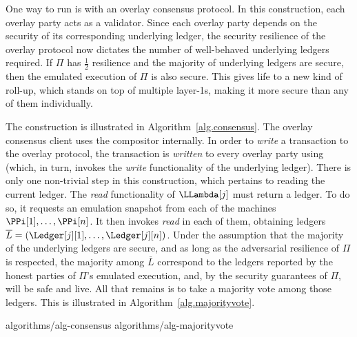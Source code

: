 \label{sec:consensus}

One way to run \rollerblade is with an overlay consensus protocol.
In this construction, each overlay party acts as a validator.
Since each overlay party depends on the security of its
corresponding underlying ledger, the security resilience
of the overlay protocol now dictates the number of well-behaved
underlying ledgers required.
If $\Pi$ has $\frac{1}{2}$ resilience and the majority of underlying
ledgers are secure, then the emulated execution of $\Pi$ is also secure.
This gives life to a new kind of roll-up, which stands on top of multiple
layer-1s, making it more secure than any of them individually.

The construction is illustrated in Algorithm~\ref{alg.consensus}. The
overlay consensus client uses the \rollerblade compositor internally.
In order to \emph{write} a transaction to the overlay protocol, the
transaction is \emph{written} to every overlay party using \writeToMachine
(which, in turn, invokes the \emph{write} functionality of the underlying ledger).
There is only one non-trivial step in this construction, which pertains
to reading the current ledger. The \emph{read} functionality
of $\LLambda[j]$ must return a ledger. To do so, it requests an emulation snapshot from
each of the machines $\PPi[1], \ldots, \PPi[n]$. It then invokes \emph{read}
in each of them, obtaining ledgers $\overline{L} = (\Ledger[j][1], \ldots, \Ledger[j][n])$.
Under the assumption that the majority of the underlying ledgers are secure,
and as long as the adversarial resilience of $\Pi$ is respected, the
majority among $\overline{L}$ correspond to the ledgers reported by the
honest parties of $\Pi$'s emulated execution, and, by the security guarantees
of $\Pi$, will be safe and live. All that remains is to take a majority vote
among those ledgers. This is illustrated in Algorithm~\ref{alg.majorityvote}.

{algorithms/alg-consensus}
{algorithms/alg-majorityvote}


